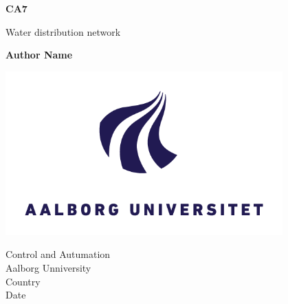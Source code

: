 \begin{titlepage}
   \begin{center}
       \vspace*{1cm}

       \textbf{CA7}

       \vspace{0.5cm}
        Water distribution network
            
       \vspace{1.5cm}

       \textbf{Author Name}

       \vfill
            
        
            
       \vspace{0.8cm}
     
       \includegraphics[width=0.8\textwidth]{Pictures/aaulogo.png}
            
       Control and Autumation\\
       Aalborg Unniversity\\
       Country\\
       Date
            
   \end{center}
\end{titlepage}